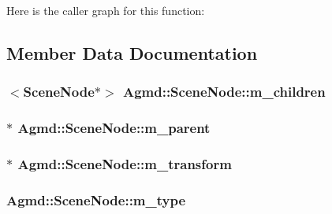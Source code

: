 Here is the caller graph for this function\+:




\subsection{Member Data Documentation}
\hypertarget{class_agmd_1_1_scene_node_aa2657c3c7b7bdae0fab8a4e66170a6c4}{
\subsubsection[{m\+\_\+children}]{$<${\bf Scene\+Node}$\ast$$>$ Agmd\+::\+Scene\+Node\+::m\+\_\+children\hspace{0.3cm}{\ttfamily [protected]}}}\label{class_agmd_1_1_scene_node_aa2657c3c7b7bdae0fab8a4e66170a6c4}
\hypertarget{class_agmd_1_1_scene_node_a5112314f51117dbd59cd43330dfb50d7}{
\subsubsection[{m\+\_\+parent}]{$\ast$ Agmd\+::\+Scene\+Node\+::m\+\_\+parent\hspace{0.3cm}{\ttfamily [protected]}}}\label{class_agmd_1_1_scene_node_a5112314f51117dbd59cd43330dfb50d7}
\hypertarget{class_agmd_1_1_scene_node_a0587fe34600b0ba0f739d04b0712553e}{
\subsubsection[{m\+\_\+transform}]{$\ast$ Agmd\+::\+Scene\+Node\+::m\+\_\+transform\hspace{0.3cm}{\ttfamily [protected]}}}\label{class_agmd_1_1_scene_node_a0587fe34600b0ba0f739d04b0712553e}
\hypertarget{class_agmd_1_1_scene_node_a1322779a116c1ae5df21e2e1920d3ba0}{
\subsubsection[{m\+\_\+type}]{ Agmd\+::\+Scene\+Node\+::m\+\_\+type\hspace{0.3cm}{\ttfamily [protected]}}}\label{class_agmd_1_1_scene_node_a1322779a116c1ae5df21e2e1920d3ba0}


